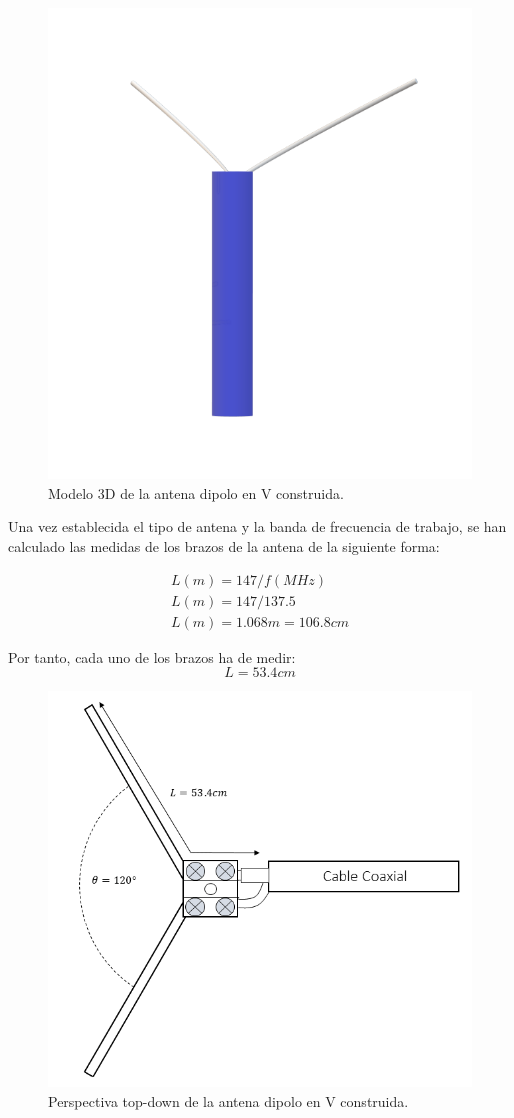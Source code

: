 \documentclass[a4paper,openright,12pt]{article}
\begin{document}
\begin{figure}[h!]
    \centering
    \includegraphics[width=0.45\linewidth]{imagenes/ModeloAntena.png}
    \caption{Modelo 3D de la antena dipolo en V construida.}
    \label{fig:modelo3D}
\end{figure}



Una vez establecida el tipo de antena y la banda de frecuencia de trabajo, se han calculado las medidas de los brazos de la antena de la siguiente forma:

\begin{gather}
        L(m) = 147/f(MHz) \\
       L(m) = 147/137.5 \\
       L(m) = 1.068m = 106.8cm
\end{gather}

Por tanto, cada uno de los brazos ha de medir: 
\begin{equation*}
    L = 53.4cm
\end{equation*}

\begin{figure}[h!]
    \centering
    \includegraphics[width=0.5\linewidth]{imagenes/PerspectivaTopDown.png}
    \caption{Perspectiva top-down de la antena dipolo en V construida.}
    \label{fig:topdown}
\end{figure}
\end{document}
